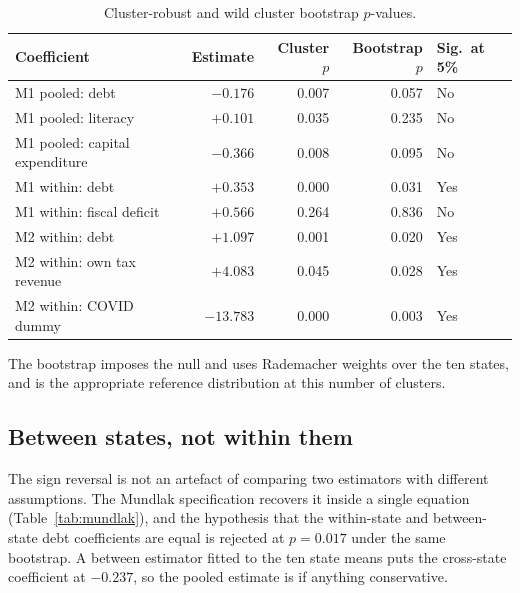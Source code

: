 \documentclass[12pt]{article}
\newcommand{\tnote}[1]{%
  \par\addvspace{4pt}%
  \begin{minipage}{0.92\textwidth}\footnotesize\raggedright #1\end{minipage}}
\begin{document}
\begin{table}[H]
\centering
\caption{Cluster-robust and wild cluster bootstrap $p$-values.}
\label{tab:boot}
\small
\begin{tabular}{@{}lrrrl@{}}
\toprule
Coefficient & Estimate & Cluster $p$ & Bootstrap $p$ & Sig.\ at 5\% \\
\midrule
M1 pooled: debt                & $-0.176$  & 0.007 & 0.057 & No \\
M1 pooled: literacy            & $+0.101$  & 0.035 & 0.235 & No \\
M1 pooled: capital expenditure & $-0.366$  & 0.008 & 0.095 & No \\
M1 within: debt                & $+0.353$  & 0.000 & 0.031 & Yes \\
M1 within: fiscal deficit      & $+0.566$  & 0.264 & 0.836 & No \\
M2 within: debt                & $+1.097$  & 0.001 & 0.020 & Yes \\
M2 within: own tax revenue     & $+4.083$  & 0.045 & 0.028 & Yes \\
M2 within: COVID dummy         & $-13.783$ & 0.000 & 0.003 & Yes \\
\bottomrule
\end{tabular}
\tnote{The bootstrap imposes the null and uses Rademacher weights over the ten
states, and is the appropriate reference distribution at this number of clusters.}
\end{table}

\subsection{Between states, not within them}

The sign reversal is not an artefact of comparing two estimators with different
assumptions. The Mundlak specification recovers it inside a single equation
(Table~\ref{tab:mundlak}), and the hypothesis that the within-state and
between-state debt coefficients are equal is rejected at $p = 0.017$ under the
same bootstrap. A between estimator fitted to the ten state means puts the
cross-state coefficient at $-0.237$, so the pooled estimate is if anything
conservative.
\end{document}
